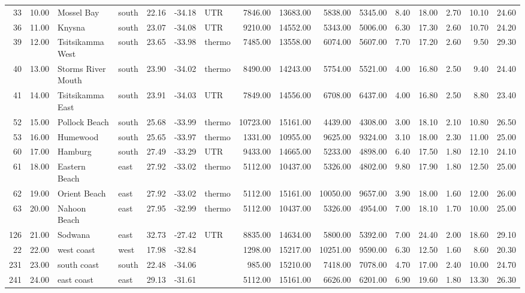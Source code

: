 \documentclass[a4paper,10pt,review]{elsarticle}
\begin{document}
\begin{table}[]
\begin{tabular}{rrllrrlrrrrrrrrr}
  33 & 10.00 & Mossel Bay & south & 22.16 & -34.18 & UTR & 7846.00 & 13683.00 & 5838.00 & 5345.00 & 8.40 & 18.00 & 2.70 & 10.10 & 24.60 \\ 
  36 & 11.00 & Knysna & south & 23.07 & -34.08 & UTR & 9210.00 & 14552.00 & 5343.00 & 5006.00 & 6.30 & 17.30 & 2.60 & 10.70 & 24.20 \\ 
  39 & 12.00 & Tsitsikamma West & south & 23.65 & -33.98 & thermo & 7485.00 & 13558.00 & 6074.00 & 5607.00 & 7.70 & 17.20 & 2.60 & 9.50 & 29.30 \\ 
  40 & 13.00 & Storms River Mouth & south & 23.90 & -34.02 & thermo & 8490.00 & 14243.00 & 5754.00 & 5521.00 & 4.00 & 16.80 & 2.50 & 9.40 & 24.40 \\ 
  41 & 14.00 & Tsitsikamma East & south & 23.91 & -34.03 & UTR & 7849.00 & 14556.00 & 6708.00 & 6437.00 & 4.00 & 16.80 & 2.50 & 8.80 & 23.40 \\ 
  52 & 15.00 & Pollock Beach & south & 25.68 & -33.99 & thermo & 10723.00 & 15161.00 & 4439.00 & 4308.00 & 3.00 & 18.10 & 2.10 & 10.80 & 26.50 \\ 
  53 & 16.00 & Humewood & south & 25.65 & -33.97 & thermo & 1331.00 & 10955.00 & 9625.00 & 9324.00 & 3.10 & 18.00 & 2.30 & 11.00 & 25.00 \\ 
  60 & 17.00 & Hamburg & south & 27.49 & -33.29 & UTR & 9433.00 & 14665.00 & 5233.00 & 4898.00 & 6.40 & 17.50 & 1.80 & 12.10 & 24.10 \\ 
  61 & 18.00 & Eastern Beach & east & 27.92 & -33.02 & thermo & 5112.00 & 10437.00 & 5326.00 & 4802.00 & 9.80 & 17.90 & 1.80 & 12.50 & 25.00 \\ 
  62 & 19.00 & Orient Beach & east & 27.92 & -33.02 & thermo & 5112.00 & 15161.00 & 10050.00 & 9657.00 & 3.90 & 18.00 & 1.60 & 12.00 & 26.00 \\ 
  63 & 20.00 & Nahoon Beach & east & 27.95 & -32.99 & thermo & 5112.00 & 10437.00 & 5326.00 & 4954.00 & 7.00 & 18.10 & 1.70 & 10.00 & 25.00 \\ 
  126 & 21.00 & Sodwana & east & 32.73 & -27.42 & UTR & 8835.00 & 14634.00 & 5800.00 & 5392.00 & 7.00 & 24.40 & 2.00 & 18.60 & 29.10 \\ 
  22 & 22.00 & west coast & west & 17.98 & -32.84 &  & 1298.00 & 15217.00 & 10251.00 & 9590.00 & 6.30 & 12.50 & 1.60 & 8.60 & 20.30 \\ 
  231 & 23.00 & south coast & south & 22.48 & -34.06 &  & 985.00 & 15210.00 & 7418.00 & 7078.00 & 4.70 & 17.00 & 2.40 & 10.00 & 24.70 \\ 
  241 & 24.00 & east coast & east & 29.13 & -31.61 &  & 5112.00 & 15161.00 & 6626.00 & 6201.00 & 6.90 & 19.60 & 1.80 & 13.30 & 26.30 \\ 
  \hline
  \end{tabular}
\end{table}
\end{document}
